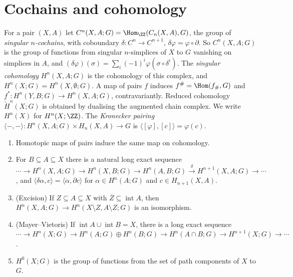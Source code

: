 \section{Cochains and cohomology}\label{singular-homology:section-cochains}

\begin{definition}\label{singular-homology:definition-cohomology}
For a pair $(X, A)$ let $C^n(X, A; G) = \Hom_\ZZ(C_n(X, A), G)$, the group of \emph{singular $n$-cochains}, with coboundary
$\delta \colon C^n \to C^{n+1}$, $\delta\varphi = \varphi \circ \partial$. So $C^n(X, A; G)$ is the group of functions from singular $n$-simplices of $X$ to $G$ vanishing on
simplices in $A$, and $(\delta\varphi)(\sigma) = \sum_i(-1)^i\varphi(\sigma \circ \delta^i)$. The \emph{singular cohomology} $H^n(X, A; G)$ is the cohomology of this complex,
and $H^n(X; G) = H^n(X, \emptyset; G)$. A map of pairs $f$ induces $f^\# = \Hom(f_\#, G)$ and $f^* \colon H^n(Y, B; G) \to H^n(X, A; G)$, contravariantly. Reduced cohomology
$\tilde{H}^n(X; G)$ is obtained by dualising the augmented chain complex. We write $H^n(X)$ for $H^n(X; \ZZ)$. The \emph{Kronecker pairing}
$\langle -, - \rangle \colon H^n(X, A; G) \times H_n(X, A) \to G$ is $\langle[\varphi], [c]\rangle = \varphi(c)$.
\end{definition}

\begin{theorem}\label{singular-homology:theorem-axioms}
\begin{enumerate}
\item Homotopic maps of pairs induce the same map on cohomology.
\item For $B \subseteq A \subseteq X$ there is a natural long exact sequence
$\cdots \to H^n(X, A; G) \to H^n(X, B; G) \to H^n(A, B; G) \xrightarrow{\delta} H^{n+1}(X, A; G) \to \cdots$, and
$\langle \delta\alpha, c \rangle = \langle \alpha, \partial c \rangle$ for $\alpha \in H^n(A; G)$ and $c \in H_{n+1}(X, A)$.
\item (Excision) If $Z \subseteq A \subseteq X$ with $\overline{Z} \subseteq \operatorname{int}A$, then $H^n(X, A; G) \to H^n(X \setminus Z, A \setminus Z; G)$ is an isomorphism.
\item (Mayer--Vietoris) If $\operatorname{int}A \cup \operatorname{int}B = X$, there is a long exact sequence
$\cdots \to H^n(X; G) \to H^n(A; G) \oplus H^n(B; G) \to H^n(A \cap B; G) \to H^{n+1}(X; G) \to \cdots$.
\item $H^0(X; G)$ is the group of functions from the set of path components of $X$ to $G$.
\end{enumerate}
\end{theorem}

